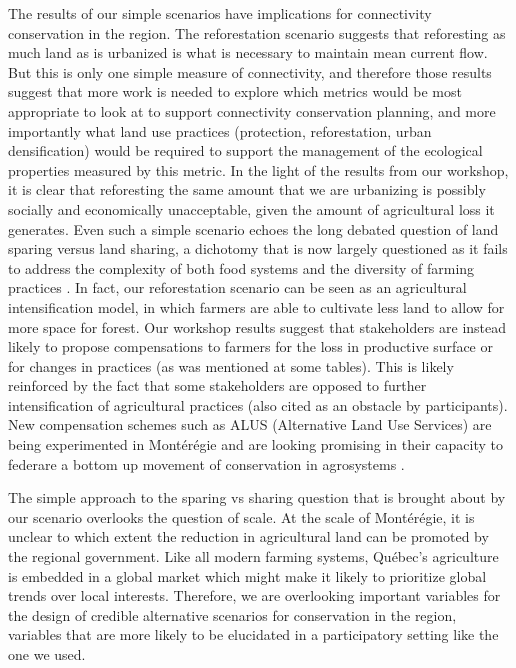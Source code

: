 {The results of our simple scenarios have implications for connectivity conservation in the region. The reforestation scenario suggests that reforesting as much land as is urbanized is what is necessary to maintain mean current flow. But this is only one simple measure of connectivity, and therefore those results suggest that more work is needed to explore which metrics would be most appropriate to look at to support connectivity conservation planning, and more importantly what land use practices (protection, reforestation, urban densification) would be required to support the management of the ecological properties measured by this metric. In the light of the results from our workshop, it is clear that reforesting the same amount that we are urbanizing is possibly socially and economically unacceptable, given the amount of agricultural loss it generates. Even such a simple scenario echoes the long debated question of land sparing versus land sharing, a dichotomy that is now largely questioned as it fails to address the complexity of both food systems and the diversity of farming practices \cite{tscharntke_global_2012, bennett_changing_2017}. In fact, our reforestation scenario can be seen as an agricultural intensification model, in which farmers are able to cultivate less land to allow for more space for forest. Our workshop results suggest that stakeholders are instead likely to propose compensations to farmers for the loss in productive surface or for changes in practices (as was mentioned at some tables). This is likely reinforced by the fact that some stakeholders are opposed to further intensification of agricultural practices (also cited as an obstacle by participants). New compensation schemes such as ALUS (Alternative Land Use Services) are being experimented in Montérégie and are looking promising in their capacity to federare a bottom up movement of conservation in agrosystems \cite{ouellet_community_2020}. 

The simple approach to the sparing vs sharing question that is brought about by our scenario overlooks the question of scale. At the scale of Montérégie, it is unclear to which extent the reduction in agricultural land can be promoted by the regional government. Like all modern farming systems, Québec's agriculture is embedded in a global market which might make it likely to prioritize global trends over local interests. Therefore, we are overlooking important variables for the design of credible alternative scenarios for conservation in the region, variables that are more likely to be elucidated in a participatory setting like the one we used.

}
